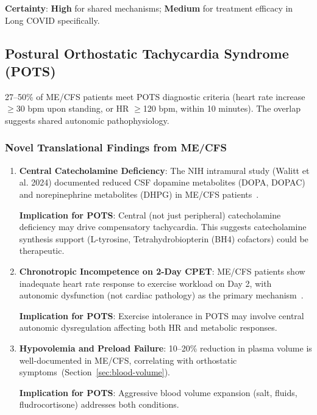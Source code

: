 \textbf{Certainty}: \textbf{High} for shared mechanisms; \textbf{Medium} for treatment efficacy in Long COVID specifically.

\subsection{Postural Orthostatic Tachycardia Syndrome (POTS)}
\label{sec:translational-pots}

27--50\% of ME/CFS patients meet POTS diagnostic criteria (heart rate increase $\geq$30 bpm upon standing, or HR $\geq$120 bpm, within 10 minutes). The overlap suggests shared autonomic pathophysiology.

\subsubsection{Novel Translational Findings from ME/CFS}

\begin{enumerate}
    \item \textbf{Central Catecholamine Deficiency}: The NIH intramural study (Walitt et al. 2024) documented reduced CSF dopamine metabolites (DOPA, DOPAC) and norepinephrine metabolites (DHPG) in ME/CFS patients~\cite{Walitt2024NIH}.

    \textbf{Implication for POTS}: Central (not just peripheral) catecholamine deficiency may drive compensatory tachycardia. This suggests catecholamine synthesis support (L-tyrosine, Tetrahydrobiopterin (BH4) cofactors) could be therapeutic.

    \item \textbf{Chronotropic Incompetence on 2-Day CPET}: ME/CFS patients show inadequate heart rate response to exercise workload on Day 2, with autonomic dysfunction (not cardiac pathology) as the primary mechanism~\cite{keller2024cpet}.

    \textbf{Implication for POTS}: Exercise intolerance in POTS may involve central autonomic dysregulation affecting both HR and metabolic responses.

    \item \textbf{Hypovolemia and Preload Failure}: 10--20\% reduction in plasma volume is well-documented in ME/CFS, correlating with orthostatic symptoms~(Section~\ref{sec:blood-volume}).

    \textbf{Implication for POTS}: Aggressive blood volume expansion (salt, fluids, fludrocortisone) addresses both conditions.
\end{enumerate}

